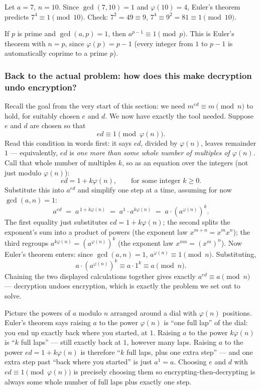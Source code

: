 \begin{example}
Let $a=7$, $n=10$. Since $\gcd(7,10)=1$ and $\varphi(10)=4$, Euler's theorem predicts $7^4\equiv1\pmod{10}$. Check: $7^2=49\equiv9$, $7^4\equiv9^2=81\equiv1\pmod{10}$. \checkmark
\end{example}

\begin{corollary}
If $p$ is prime and $\gcd(a,p) = 1$, then $a^{p-1} \equiv 1 \pmod p$. This is Euler's theorem with $n = p$, since $\varphi(p) = p - 1$ (every integer from $1$ to $p-1$ is automatically coprime to a prime $p$).
\end{corollary}

\subsubsection*{Back to the actual problem: how does this make decryption undo encryption?}

Recall the goal from the very start of this section: we need $m^{ed}\equiv m\pmod n$ to hold, for suitably chosen $e$ and $d$. We now have exactly the tool needed. Suppose $e$ and $d$ are chosen so that
\[
ed \equiv 1 \pmod{\varphi(n)}.
\]
Read this condition in words first: it says $ed$, divided by $\varphi(n)$, leaves remainder $1$ — equivalently, $ed$ is \emph{one more than some whole number of multiples of $\varphi(n)$}. Call that whole number of multiples $k$, so as an equation over the integers (not just modulo $\varphi(n)$):
\[
ed = 1 + k\varphi(n), \qquad \text{for some integer } k \ge 0.
\]
Substitute this into $a^{ed}$ and simplify one step at a time, assuming for now $\gcd(a,n)=1$:
\[
a^{ed} \;=\; a^{\,1+k\varphi(n)} \;=\; a^{1}\cdot a^{k\varphi(n)} \;=\; a\cdot\left(a^{\varphi(n)}\right)^{k}.
\]
The first equality just substitutes $ed=1+k\varphi(n)$; the second splits the exponent's sum into a product of powers (the exponent law $x^{m+n}=x^mx^n$); the third regroups $a^{k\varphi(n)}=(a^{\varphi(n)})^k$ (the exponent law $x^{mn}=(x^m)^n$). Now Euler's theorem enters: since $\gcd(a,n)=1$, $a^{\varphi(n)}\equiv1\pmod n$. Substituting,
\[
a\cdot\left(a^{\varphi(n)}\right)^{k} \equiv a\cdot1^{k} \equiv a \pmod n.
\]
Chaining the two displayed calculations together gives exactly $a^{ed}\equiv a\pmod n$ — decryption undoes encryption, which is exactly the problem we set out to solve.

\begin{remark}
Picture the powers of $a$ modulo $n$ arranged around a dial with $\varphi(n)$ positions. Euler's theorem says raising $a$ to the power $\varphi(n)$ is ``one full lap'' of the dial: you end up exactly back where you started, at $1$. Raising $a$ to the power $k\varphi(n)$ is ``$k$ full laps'' — still exactly back at $1$, however many laps. Raising $a$ to the power $ed=1+k\varphi(n)$ is therefore ``$k$ full laps, plus one extra step'' — and one extra step past ``back where you started'' is just $a^1=a$. Choosing $e$ and $d$ with $ed\equiv1\pmod{\varphi(n)}$ is precisely choosing them so encrypting-then-decrypting is always some whole number of full laps plus exactly one step.
\end{remark}


